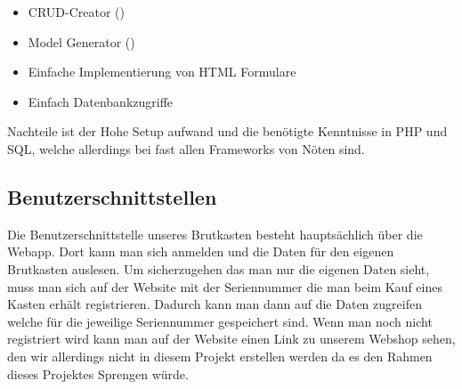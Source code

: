 \begin{itemize}
	\item CRUD-Creator ()
	\item Model Generator ()
	\item Einfache Implementierung von HTML Formulare
	\item Einfach Datenbankzugriffe
\end{itemize}

Nachteile ist der Hohe Setup aufwand und die benötigte Kenntnisse in PHP und SQL, welche allerdings bei fast allen Frameworks von Nöten sind.


\subsection{Benutzerschnittstellen} 

Die Benutzerschnittstelle unseres Brutkasten besteht hauptsächlich über die Webapp. Dort kann man sich anmelden und die Daten für den eigenen Brutkasten auslesen. Um sicherzugehen das man nur die eigenen Daten sieht, muss man sich auf der Website mit der Seriennummer die man beim Kauf eines Kasten erhält registrieren. Dadurch kann man dann auf die Daten zugreifen welche für die jeweilige Seriennummer gespeichert sind.
\newline
Wenn man noch nicht registriert wird kann man auf der Website einen Link zu unserem Webshop sehen, den wir allerdings nicht in diesem Projekt erstellen werden da es den Rahmen dieses Projektes Sprengen würde.
